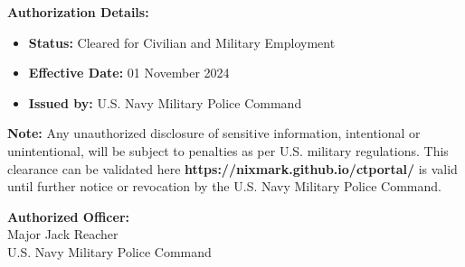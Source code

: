 \documentclass[a4paper,12pt]{article}
\begin{document}
	\textbf{Authorization Details:}
	\begin{itemize}
		\item \textbf{Status:} Cleared for Civilian and Military Employment
		\item \textbf{Effective Date:} 01 November 2024
		\item \textbf{Issued by:} U.S. Navy Military Police Command
	\end{itemize}
	
	\vspace{0.5cm}
	
	\noindent \textbf{Note:} Any unauthorized disclosure of sensitive information, intentional or unintentional, will be subject to penalties as per U.S. military regulations. This clearance can be validated here \textbf{https://nixmark.github.io/ctportal/} is valid until further notice or revocation by the U.S. Navy Military Police Command.
	
	\vspace{1cm}
	
	\begin{center}
		\textbf{Authorized Officer:} \\[1ex]
		{\fontsize{12pt}{14pt}\selectfont \textsf{Major Jack Reacher}} \\
		U.S. Navy Military Police Command
	\end{center}
	
\end{document}
